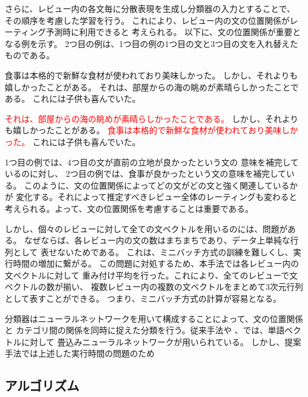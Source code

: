 \documentclass{ttithesis}
\begin{document}
さらに、レビュー内の各文毎に分散表現を生成し分類器の入力とすることで、
その順序を考慮した学習を行う。
これにより、レビュー内の文の位置関係がレーティング予測時に利用できると
考えられる。
以下に、文の位置関係が重要となる例を示す。
2つ目の例は、1つ目の例の1つ目の文と3つ目の文を入れ替えたものである。

\begin{addmargin}{8ex}
  \vspace{1em}
  食事は本格的で新鮮な食材が使われており美味しかった。
  しかし、それよりも嬉しかったことがある。
  それは、部屋からの海の眺めが素晴らしかったことである。
  これには子供も喜んでいた。
\end{addmargin}

\begin{addmargin}{8ex}
  \vspace{1em}
  \textcolor{red}{それは、部屋からの海の眺めが素晴らしかったことである。}
  しかし、それよりも嬉しかったことがある。
  \textcolor{red}{食事は本格的で新鮮な食材が使われており美味しかった。}
  これには子供も喜んでいた。
\end{addmargin}

1つ目の例では、4つ目の文が直前の立地が良かったという文の
意味を補完しているのに対し、
2つ目の例では、食事が良かったという文の意味を補完している。
このように、文の位置関係によってどの文がどの文と強く関連しているかが
変化する。それによって推定すべきレビュー全体のレーティングも変わると
考えられる。よって、文の位置関係を考慮することは重要である。

しかし、個々のレビューに対して全ての文ベクトルを用いるのには、問題がある。
なぜならば、各レビュー内の文の数はまちまちであり、データ上単純な行列として
表せないためである。
これは、ミニバッチ方式の訓練を難しくし、実行時間の増加に繋がる。
この問題に対処するため、本手法では各レビュー内の文ベクトルに対して
重み付け平均を行った。これにより、全てのレビューで文ベクトルの数が揃い、
複数レビュー内の複数の文ベクトルをまとめて3次元行列として表すことができる。
つまり、ミニバッチ方式の計算が容易となる。

分類器はニューラルネットワークを用いて構成することによって、文の位置関係と
カテゴリ間の関係を同時に捉えた分類を行う。従来手法\cite{nal14}や
\cite{rie14}、\cite{duyu15}では、単語ベクトルに対して
畳込みニューラルネットワークが用いられている。
しかし、提案手法では上述した実行時間の問題のため


\subsection{アルゴリズム}
\end{document}

